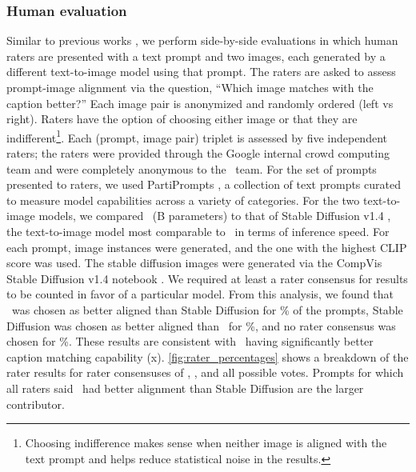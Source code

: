 \subsubsection{Human evaluation}

Similar to previous works \citep{parti, imagen}, we perform side-by-side evaluations in which human raters are presented with a text prompt and two images, each generated by a different text-to-image model using that prompt. The raters are asked to assess prompt-image alignment via the question, ``Which image matches with the caption better?'' Each image pair is anonymized and randomly ordered (left vs right). Raters have the option of choosing either image or that they are indifferent\footnote{Choosing indifference makes sense when neither image is aligned with the text prompt and helps reduce statistical noise in the results.}. Each (prompt, image pair) triplet is assessed by five independent raters; the raters were provided through the Google internal crowd computing team and were completely anonymous to the \name~team. For the set of prompts presented to raters, we used PartiPrompts \citep{parti}, a collection of  text prompts curated to measure model capabilities across a variety of categories. For the two text-to-image models, we compared \name~(B parameters) to that of Stable Diffusion v1.4 \citep{ldm}, the text-to-image model most comparable to \name~in terms of inference speed. For each prompt,  image instances were generated, and the one with the highest CLIP score \citep{clip} was used. The stable diffusion images were generated via the CompVis Stable Diffusion v1.4 notebook \citep{sdgeneration}. We required at least a  rater consensus for results to be counted in favor of a particular model. From this analysis, we found that \name~was chosen as better aligned than Stable Diffusion for \% of the prompts, Stable Diffusion was chosen as better aligned than \name~for \%, and no rater consensus was chosen for \%. These results are consistent with \name~having significantly better caption matching capability (x). \cref{fig:rater_percentages} shows a breakdown of the rater results for rater consensuses of , , and all  possible votes. Prompts for which all  raters said \name~had better alignment than Stable Diffusion are the larger contributor.

